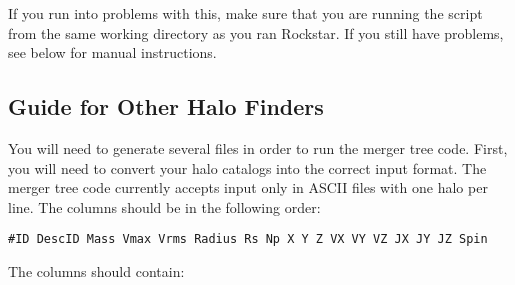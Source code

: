 \documentclass[12pt]{article}
\begin{document}
      If you run into problems with this, make sure that you are running the
      script from the same working directory as you ran Rockstar.  If you
      still have problems, see below for manual instructions.
      
 \subsection{Guide for Other Halo Finders}
     
     You will need to generate several files in order to run the merger tree
      code.  First, you will need to convert your halo catalogs into the correct
      input format.  The merger tree code currently accepts input only in
      ASCII files with one halo per line.  The columns should be in the
      following order:
\begin{verbatim}
#ID DescID Mass Vmax Vrms Radius Rs Np X Y Z VX VY VZ JX JY JZ Spin
\end{verbatim}
      The columns should contain:
\end{document}
